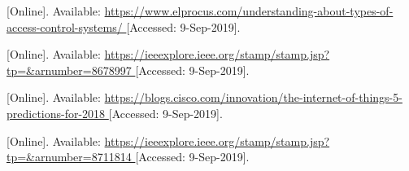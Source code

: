 \begin{thebibliography}{9}


[Online]. Available:
\url{
https://www.elprocus.com/understanding-about-types-of-access-control-systems/
}
[Accessed: 9-Sep-2019].




[Online]. Available:
\url{
https://ieeexplore.ieee.org/stamp/stamp.jsp?tp=&arnumber=8678997
}
[Accessed: 9-Sep-2019].



[Online]. Available:
\url{
https://blogs.cisco.com/innovation/the-internet-of-things-5-predictions-for-2018
}
[Accessed: 9-Sep-2019].



[Online]. Available:
\url{
https://ieeexplore.ieee.org/stamp/stamp.jsp?tp=&arnumber=8711814
}
[Accessed: 9-Sep-2019].

















\end{thebibliography}